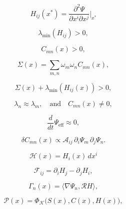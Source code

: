 \[
H_{ij}(x^\ast) = \frac{\partial^2 \Psi}{\partial x^i \partial x^j}\bigg|_{x^\ast}
\]

\[
\lambda_{\min}(H_{ij}) > 0,
\]

\[
C_{mn}(x) > 0,
\]

\[
\Sigma(x) = \sum_{m,n} \omega_m \omega_n C_{mn}(x),
\]

\[
\Sigma(x) + \lambda_{\min}(H_{ij}(x)) > 0,
\]

\[
\lambda_n \approx \lambda_m,
\quad\text{and}\quad
C_{mn}(x) \neq 0,
\]

\[
\frac{d}{dt} \Psi_{\mathrm{eff}} \approx 0,
\]

\[
\delta C_{mn}(x) \propto \mathcal{A}_{ij} \,\partial_i \Psi_m \,\partial_j \Psi_n.
\]

\[
\mathcal{H}(x) = H_i(x)\, dx^i
\]

\[
\mathcal{F}_{ij} = \partial_i H_j - \partial_j H_i,
\]

\[
\Gamma_n(x) = \langle \nabla \Psi_n, \mathcal{R} H \rangle,
\]

\[
\mathcal{P}(x) = \Phi_{\mathcal{K}}\big(S(x), C(x), H(x)\big),
\]

